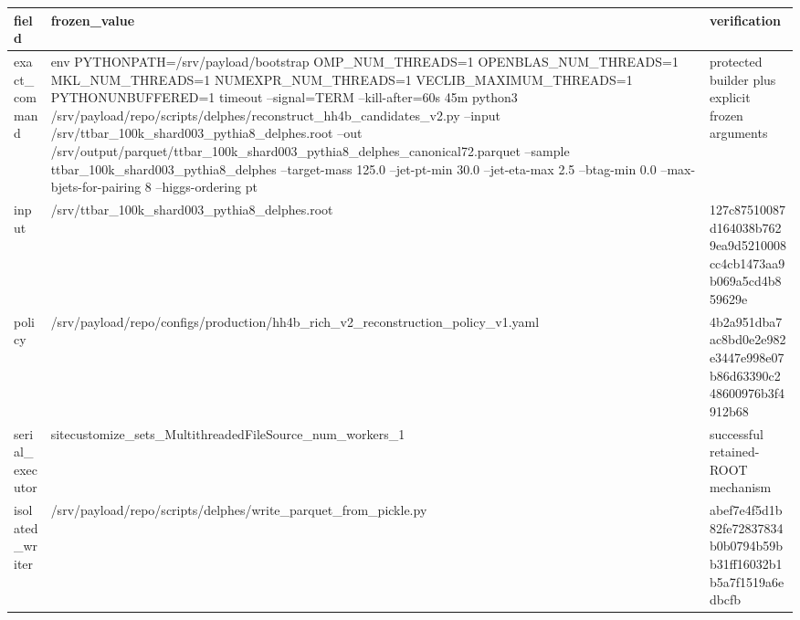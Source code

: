 \begin{tabular}{lll}
\toprule
field & frozen\_value & verification \\
\midrule
exact\_command & env PYTHONPATH=/srv/payload/bootstrap OMP\_NUM\_THREADS=1 OPENBLAS\_NUM\_THREADS=1 MKL\_NUM\_THREADS=1 NUMEXPR\_NUM\_THREADS=1 VECLIB\_MAXIMUM\_THREADS=1 PYTHONUNBUFFERED=1 timeout --signal=TERM --kill-after=60s 45m python3 /srv/payload/repo/scripts/delphes/reconstruct\_hh4b\_candidates\_v2.py --input /srv/ttbar\_100k\_shard003\_pythia8\_delphes.root --out /srv/output/parquet/ttbar\_100k\_shard003\_pythia8\_delphes\_canonical72.parquet --sample ttbar\_100k\_shard003\_pythia8\_delphes --target-mass 125.0 --jet-pt-min 30.0 --jet-eta-max 2.5 --btag-min 0.0 --max-bjets-for-pairing 8 --higgs-ordering pt & protected builder plus explicit frozen arguments \\
input & /srv/ttbar\_100k\_shard003\_pythia8\_delphes.root & 127c87510087d164038b7629ea9d5210008cc4cb1473aa9b069a5cd4b859629e \\
policy & /srv/payload/repo/configs/production/hh4b\_rich\_v2\_reconstruction\_policy\_v1.yaml & 4b2a951dba7ac8bd0e2e982e3447e998e07b86d63390c248600976b3f4912b68 \\
serial\_executor & sitecustomize\_sets\_MultithreadedFileSource\_num\_workers\_1 & successful retained-ROOT mechanism \\
isolated\_writer & /srv/payload/repo/scripts/delphes/write\_parquet\_from\_pickle.py & abef7e4f5d1b82fe72837834b0b0794b59bb31ff16032b1b5a7f1519a6edbcfb \\
\bottomrule
\end{tabular}
